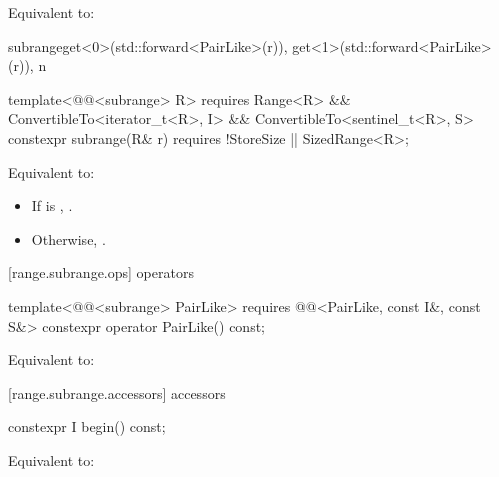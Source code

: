 \begin{itemdescr}
\pnum
\effects Equivalent to:
\begin{codeblock}
subrange{get<0>(std::forward<PairLike>(r)), get<1>(std::forward<PairLike>(r)), n}
\end{codeblock}
\end{itemdescr}

{\color{oldclr}
%
\begin{itemdecl}
template<@@<subrange> R>
  requires Range<R> && ConvertibleTo<iterator_t<R>, I> && ConvertibleTo<sentinel_t<R>, S>
constexpr subrange(R& r) requires !StoreSize || SizedRange<R>;
\end{itemdecl}

\begin{itemdescr}
\pnum
\effects Equivalent to:
\begin{itemize}
\item If  is ,
.
\item Otherwise,
.
\end{itemize}
\end{itemdescr}
} %

[range.subrange.ops]{ operators}

%
\begin{itemdecl}
template<@@<subrange> PairLike>
  requires @@<PairLike, const I&, const S&>
constexpr operator PairLike() const;
\end{itemdecl}

\begin{itemdescr}
\pnum
\effects Equivalent to: 
\end{itemdescr}

[range.subrange.accessors]{ accessors}

%
\begin{itemdecl}
constexpr I begin() const;
\end{itemdecl}

\begin{itemdescr}
\pnum
\effects Equivalent to: 
\end{itemdescr}

